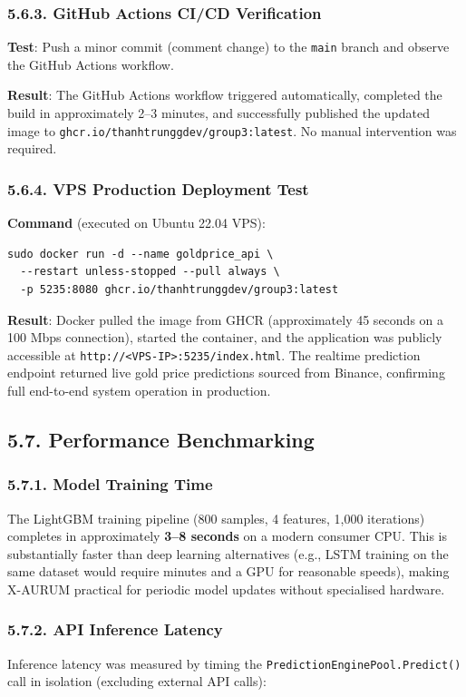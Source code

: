 \subsubsection{5.6.3. GitHub Actions CI/CD Verification}
\textbf{Test}: Push a minor commit (comment change) to the \texttt{main} branch and observe the GitHub Actions workflow.

\textbf{Result}: The GitHub Actions workflow triggered automatically, completed the build in approximately 2--3 minutes, and successfully published the updated image to \texttt{ghcr.io/thanhtrunggdev/group3:latest}. No manual intervention was required.

\subsubsection{5.6.4. VPS Production Deployment Test}
\textbf{Command} (executed on Ubuntu 22.04 VPS):
\begin{lstlisting}[language={}, numbers=none]
sudo docker run -d --name goldprice_api \
  --restart unless-stopped --pull always \
  -p 5235:8080 ghcr.io/thanhtrunggdev/group3:latest
\end{lstlisting}

\textbf{Result}: Docker pulled the image from GHCR (approximately 45 seconds on a 100 Mbps connection), started the container, and the application was publicly accessible at \texttt{http://<VPS-IP>:5235/index.html}. The realtime prediction endpoint returned live gold price predictions sourced from Binance, confirming full end-to-end system operation in production.

\subsection{5.7. Performance Benchmarking}

\subsubsection{5.7.1. Model Training Time}
The LightGBM training pipeline (800 samples, 4 features, 1,000 iterations) completes in approximately \textbf{3--8 seconds} on a modern consumer CPU. This is substantially faster than deep learning alternatives (e.g., LSTM training on the same dataset would require minutes and a GPU for reasonable speeds), making X-AURUM practical for periodic model updates without specialised hardware.

\subsubsection{5.7.2. API Inference Latency}
Inference latency was measured by timing the \texttt{PredictionEnginePool.Predict()} call in isolation (excluding external API calls):

